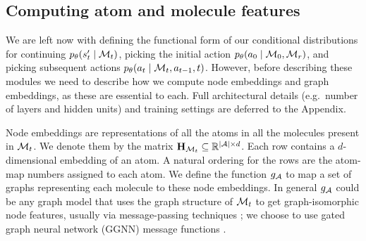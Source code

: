 \subsection{Computing atom and molecule features}


We are left now with defining the functional form of our conditional distributions for continuing $p_\theta(s'_t \mid {\mathcal{M}}_t)$, picking the initial action $p_\theta(a_0 \mid {\mathcal{M}}_0, {\mathcal{M}}_r)$, and picking subsequent actions $p_\theta(a_t \mid {\mathcal{M}}_t, a_{t-1}, t)$.
However, before describing these modules we need to describe how we compute node embeddings and graph embeddings, as these  are  essential to each.
Full architectural details (e.g.\ number of layers and hidden units) 
and training settings are deferred to the Appendix.

Node embeddings are representations of all the atoms in all the molecules present in ${\mathcal{M}}_t$.
 We denote them by the matrix ${\mathbf{H}}_{{\mathcal{M}}_t} \subseteq \mathbb{R}^{|{\mathcal{A}}|\times d}$.
Each row contains a $d$-dimensional embedding of an atom. 
A natural ordering for the rows are the atom-map numbers assigned to each atom.
We define the function $g_{{\mathcal{A}}}$ to map a set of graphs representing each molecule to these node embeddings.
In general $g_{{\mathcal{A}}}$ could be any graph model that uses the graph structure of ${\mathcal{M}}_t$ to get graph-isomorphic node features, usually via message-passing techniques \citep{gilmer2017neural};
we choose to use gated graph neural network (GGNN) message functions \citep{li2016gated}.


